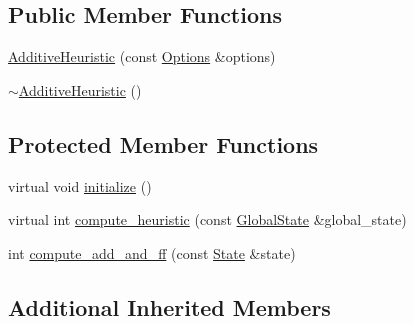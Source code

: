 \subsection*{Public Member Functions}
\begin{DoxyCompactItemize}
\item 
\hyperlink{classAdditiveHeuristic_acd989fb614ffd4bb4523fa01fc9e0a0d}{Additive\-Heuristic} (const \hyperlink{classOptions}{Options} \&options)
\item 
\hyperlink{classAdditiveHeuristic_ae59ba3ba74b38fb9ef3b6d35be6e2c48}{$\sim$\-Additive\-Heuristic} ()
\end{DoxyCompactItemize}
\subsection*{Protected Member Functions}
\begin{DoxyCompactItemize}
\item 
virtual void \hyperlink{classAdditiveHeuristic_a4c952cd832e8dd3ea364d8cac379ebbc}{initialize} ()
\item 
virtual int \hyperlink{classAdditiveHeuristic_ad2c71f6c5198a7276b7892e2d0a5bca8}{compute\-\_\-heuristic} (const \hyperlink{classGlobalState}{Global\-State} \&global\-\_\-state)
\item 
int \hyperlink{classAdditiveHeuristic_a704d2da5f869d2e0b3ed726b87130343}{compute\-\_\-add\-\_\-and\-\_\-ff} (const \hyperlink{classState}{State} \&state)
\end{DoxyCompactItemize}
\subsection*{Additional Inherited Members}


